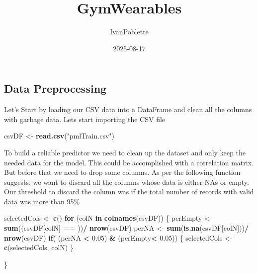 \documentclass[
]{article}
\title{GymWearables}
\author{IvanPoblette}
\date{2025-08-17}
\newenvironment{Shaded}{\begin{snugshade}}{\end{snugshade}}
\newcommand{\ControlFlowTok}[1]{\textcolor[rgb]{0.13,0.29,0.53}{\textbf{#1}}}
\newcommand{\FloatTok}[1]{\textcolor[rgb]{0.00,0.00,0.81}{#1}}
\newcommand{\FunctionTok}[1]{\textcolor[rgb]{0.13,0.29,0.53}{\textbf{#1}}}
\newcommand{\NormalTok}[1]{#1}
\newcommand{\OtherTok}[1]{\textcolor[rgb]{0.56,0.35,0.01}{#1}}
\newcommand{\SpecialCharTok}[1]{\textcolor[rgb]{0.81,0.36,0.00}{\textbf{#1}}}
\newcommand{\StringTok}[1]{\textcolor[rgb]{0.31,0.60,0.02}{#1}}
\begin{document}
\maketitle

\subsection{Data Preprocessing}\label{data-preprocessing}

Let's Start by loading our CSV data into a DataFrame and clean all the
columns with garbage data. Lets start importing the CSV file

\begin{Shaded}
\begin{Highlighting}[]
\NormalTok{csvDF }\OtherTok{\textless{}{-}} \FunctionTok{read.csv}\NormalTok{(}\StringTok{"pmlTrain.csv"}\NormalTok{)}
\end{Highlighting}
\end{Shaded}

To build a reliable predictor we need to clean up the dataset and only
keep the needed data for the model. This could be accomplished with a
correlation matrix. But before that we need to drop some columns. As per
the following function suggests, we want to discard all the columns
whose data is either NAs or empty. Our threshold to discard the column
was if the total number of records with valid data was more than 95\%

\begin{Shaded}
\begin{Highlighting}[]
\NormalTok{selectedCols }\OtherTok{\textless{}{-}} \FunctionTok{c}\NormalTok{()}
\ControlFlowTok{for}\NormalTok{ (colN }\ControlFlowTok{in} \FunctionTok{colnames}\NormalTok{(csvDF))}
\NormalTok{\{}
\NormalTok{  perEmpty }\OtherTok{\textless{}{-}} \FunctionTok{sum}\NormalTok{((csvDF[colN] }\SpecialCharTok{==} \StringTok{\textquotesingle{}\textquotesingle{}}\NormalTok{))}\SpecialCharTok{/} \FunctionTok{nrow}\NormalTok{(csvDF)}
\NormalTok{  perNA }\OtherTok{\textless{}{-}} \FunctionTok{sum}\NormalTok{(}\FunctionTok{is.na}\NormalTok{(csvDF[colN]))}\SpecialCharTok{/} \FunctionTok{nrow}\NormalTok{(csvDF)}
  \ControlFlowTok{if}\NormalTok{( (perNA }\SpecialCharTok{\textless{}} \FloatTok{0.05}\NormalTok{) }\SpecialCharTok{\&}\NormalTok{ (perEmpty}\SpecialCharTok{\textless{}} \FloatTok{0.05}\NormalTok{))}
\NormalTok{  \{}
\NormalTok{    selectedCols }\OtherTok{\textless{}{-}} \FunctionTok{c}\NormalTok{(selectedCols, colN)}
\NormalTok{  \}}
      
\NormalTok{\}}
\end{Highlighting}
\end{Shaded}
\end{document}
